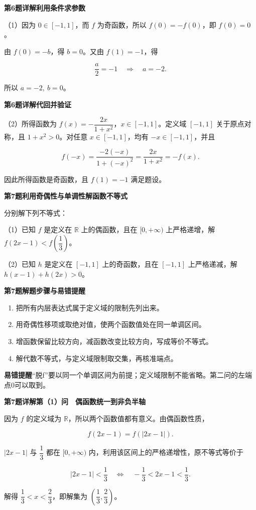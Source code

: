 \documentclass[UTF8,10pt,aspectratio=169]{ctexbeamer}
\newcommand{\PageHeading}[1]{\begin{center}{\Large\bfseries #1}\end{center}\vspace{0.12cm}}
\newcommand{\subq}[1]{\par\vspace{0.15cm}（#1）}
\begin{document}
\begin{frame}[t]
\PageHeading{第6题详解\quad 利用条件求参数}
（1）因为 $0\in[-1,1]$，而 $f$ 为奇函数，所以 $f(0)=-f(0)$，即 $f(0)=0$。
\par
\pause
由 $f(0)=-b$，得 $b=0$。又由 $f(1)=-1$，得
\par
\[\frac{a}{2}=-1\quad\Longrightarrow\quad a=-2.\]
\par
所以 $\boxed{a=-2,\ b=0}$。
\par
\end{frame}
\begin{frame}[t]
\PageHeading{第6题详解\quad 代回并验证}
（2）所得函数为 $f(x)=-\dfrac{2x}{1+x^2}$，$x\in[-1,1]$。定义域 $[-1,1]$ 关于原点对称，且 $1+x^2>0$。对任意 $x\in[-1,1]$，均有 $-x\in[-1,1]$，并且
\par
\pause
\[f(-x)=\frac{-2(-x)}{1+(-x)^2}=\frac{2x}{1+x^2}=-f(x).\]
\par
因此所得函数是奇函数，且 $f(1)=-1$ 满足题设。
\par
\end{frame}
\begin{frame}[t]
\PageHeading{第7题\quad 利用奇偶性与单调性解函数不等式}
分别解下列不等式：
\subq{1}已知 $f$ 是定义在 $\mathbb R$ 上的偶函数，且在 $[0,+\infty)$ 上严格递增，解 $f(2x-1)<f\!\left(\dfrac13\right)$。
\subq{2}已知 $h$ 是定义在 $[-1,1]$ 上的奇函数，且在 $[-1,1]$ 上严格递减，解 $h(x-1)+h(2x)>0$。
\par
\end{frame}
\begin{frame}[t]
\PageHeading{第7题\quad 解题步骤与易错提醒}
\begin{enumerate}\item 把所有内层表达式属于定义域的限制先列出来。
\item 用奇偶性移项或取绝对值，使两个函数值处在同一单调区间。
\item 增函数保留比较方向，减函数改变比较方向，写成等价不等式。
\item 解代数不等式，与定义域限制取交集，再核准端点。\end{enumerate}
\par
\pause
\vspace{0.18cm}\textbf{易错提醒}\quad “脱f”要以同一个单调区间为前提；定义域限制不能省略。第二问的左端点0可以取到。
\par
\end{frame}
\begin{frame}[t]
\PageHeading{第7题详解\quad 第（1）问　偶函数统一到非负半轴}
因为 $f$ 的定义域为 $\mathbb R$，所以两个函数值都有意义。由偶函数性质，
\par
\pause
\[f(2x-1)=f(|2x-1|).\]
\par
$|2x-1|$ 与 $\dfrac13$ 都在 $[0,+\infty)$ 内，利用该区间上的严格递增性，原不等式等价于
\par
\[|2x-1|<\frac13\quad\Longleftrightarrow\quad-\frac13<2x-1<\frac13.\]
\par
解得 $\boxed{\dfrac13<x<\dfrac23}$，即解集为 $\boxed{\left(\dfrac13,\dfrac23\right)}$。
\par
\end{frame}
\end{document}
